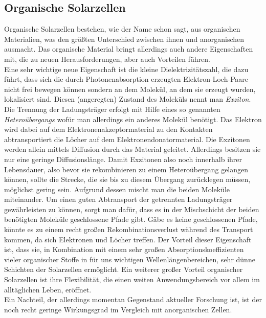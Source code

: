 \documentclass[slug=SZ, room=Hermann-Krone-Bau\,\ Labor\ 1.25, supervisor=Martin\ Kroll]{../../Lab_Report_LaTeX/lab_report}
\begin{document}
\subsection{Organische Solarzellen}
\label{sec:orgsolar}

Organische Solarzellen bestehen, wie der Name schon sagt, aus organischen Materialien, was den größten
Unterschied zwischen ihnen und anorganischen ausmacht.
Das organische Material bringt allerdings auch andere Eigenschaften mit, die zu neuen Herausforderungen, aber
auch Vorteilen führen.\\

Eine sehr wichtige neue Eigenschaft ist die kleine Dielektrizitätszahl, die dazu führt, dass sich die durch
Photonenabsorption erzeugten Elektron-Loch-Paare nicht frei bewegen können sondern an dem Molekül, an dem sie 
erzeugt wurden, lokalisiert sind. Diesen (angeregten) Zustand des Moleküls nennt man \emph{Exziton}.
Die Trennung der Ladungsträger erfolgt mit Hilfe eines so genannten \emph{Heteroübergangs} wofür man allerdings
ein anderes Molekül benötigt. Das Elektron wird dabei auf dem Elektronenakzeptormaterial zu den Kontakten
abtransportiert die Löcher auf dem Elektronendonatormaterial.
Die Exzitonen werden allein mittels Diffusion durch das Material geleitet. Allerdings besitzen sie nur eine
geringe Diffusionslänge. Damit Exzitonen also noch innerhalb ihrer Lebensdauer, also bevor sie rekombinieren
zu einem Heteroübergang gelangen können, sollte die Strecke, die sie bis zu diesem Übergang zurücklegen müssen,
möglichst gering sein. Aufgrund dessen mischt man die beiden Moleküle miteinander.
Um einen guten Abtransport der getrennten Ladungsträger gewährleisten zu können, sorgt man dafür, dass es in der
Mischschicht der beiden benötigten Moleküle geschlossene Pfade gibt. Gäbe es keine geschlossenen Pfade, könnte
es zu einem recht großen Rekombinationsverlust während des Transport kommen, da sich Elektronen und Löcher
treffen.
Der Vorteil dieser Eigenschaft ist, dass sie, in Kombination mit einem sehr großen Absorptionskoeffizienten
vieler organischer Stoffe in für uns wichtigen Wellenlängenbereichen, sehr dünne Schichten der Solarzellen 
ermöglicht.
Ein weiterer großer Vorteil organischer Solarzellen ist ihre Flexibilität, die einen weiten Anwendungsbereich
vor allem im alltäglichen Leben, eröffnet.\\

Ein Nachteil, der allerdings momentan Gegenstand aktueller Forschung ist, ist der noch recht geringe
Wirkungsgrad im Vergleich mit anorganischen Zellen.
\end{document}
